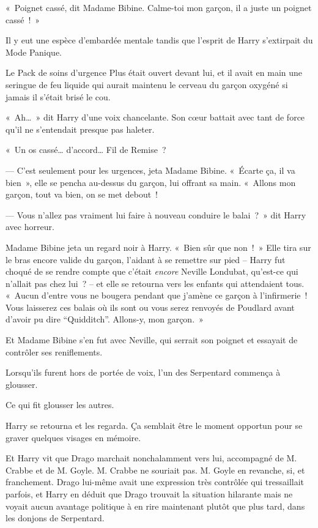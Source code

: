 «~Poignet cassé, dit Madame Bibine. Calme-toi mon garçon, il a juste un poignet cassé~!~»

Il y eut une espèce d'embardée mentale tandis que l'esprit de Harry s'extirpait du Mode Panique.

Le Pack de soins d'urgence Plus était ouvert devant lui, et il avait en main une seringue de feu liquide qui aurait maintenu le cerveau du garçon oxygéné si jamais il s'était brisé le cou.

«~Ah…~» dit Harry d'une voix chancelante. Son cœur battait avec tant de force qu'il ne s'entendait presque pas haleter.

«~Un os cassé… d'accord… Fil de Remise~?

--- C'est seulement pour les urgences, jeta Madame Bibine. «~Écarte ça, il va bien~», elle se pencha au-dessus du garçon, lui offrant sa main. «~Allons mon garçon, tout va bien, on se met debout~!

--- Vous n'allez pas vraiment lui faire à nouveau conduire le balai~?~» dit Harry avec horreur.

Madame Bibine jeta un regard noir à Harry. «~Bien sûr que non~!~» Elle tira sur le bras encore valide du garçon, l'aidant à se remettre sur pied -- Harry fut choqué de se rendre compte que c'était \emph{encore} Neville Londubat, qu'est-ce qui n'allait pas chez lui~? -- et elle se retourna vers les enfants qui attendaient tous. «~Aucun d'entre vous ne bougera pendant que j'amène ce garçon à l'infirmerie~! Vous laisserez ces balais où ils sont ou vous serez renvoyés de Poudlard avant d'avoir pu dire “Quidditch”. Allons-y, mon garçon.~»

Et Madame Bibine s'en fut avec Neville, qui serrait son poignet et essayait de contrôler ses reniflements.

Lorsqu'ils furent hors de portée de voix, l'un des Serpentard commença à glousser.

Ce qui fit glousser les autres.

Harry se retourna et les regarda. Ça semblait être le moment opportun pour se graver quelques visages en mémoire.

Et Harry vit que Drago marchait nonchalamment vers lui, accompagné de M. Crabbe et de M. Goyle. M. Crabbe ne souriait pas. M. Goyle en revanche, si, et franchement. Drago lui-même avait une expression très contrôlée qui tressaillait parfois, et Harry en déduit que Drago trouvait la situation hilarante mais ne voyait aucun avantage politique à en rire maintenant plutôt que plus tard, dans les donjons de Serpentard.

